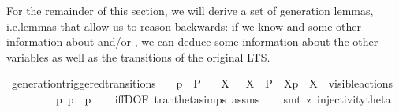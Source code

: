 \begin{isabellebody}
\begin{isamarkuptext}
\end{isamarkuptext}\isamarkuptrue%
%
\isadelimdocument
%
\endisadelimdocument
%
\isatagdocument
%
\isamarkuptrue%
%
\endisatagdocument
{\isafolddocument}%
%
\isadelimdocument
%
\endisadelimdocument
%
\begin{isamarkuptext}%
For the remainder of this section, we will derive a set of generation lemmas, i.e.\@ lemmas that allow us to reason backwards: if we know  and some other information about  and/or \isa{{\isasymalpha}}, we can deduce some information about the other variables as well as the transitions of the original LTS.%
\end{isamarkuptext}\isamarkuptrue%
\isamarkupfalse%
\ generation{\isacharunderscore}{\kern0pt}triggered{\isacharunderscore}{\kern0pt}transitions{\isacharcolon}{\kern0pt}\isanewline
\ \ \ {\isacartoucheopen}{\isasymtheta}{\isacharparenleft}{\kern0pt}p{\isacharparenright}{\kern0pt}\ {\isasymlongmapsto}\isactrlsup {\isasymtheta}{\isasymalpha}\ P{\isacharprime}{\kern0pt}{\isacartoucheclose}\isanewline
\ \ \ {\isacartoucheopen}{\isacharparenleft}{\kern0pt}{\isasymexists}X{\isachardot}{\kern0pt}\ {\isasymalpha}\ {\isacharequal}{\kern0pt}\ {\isasymepsilon}{\isacharbrackleft}{\kern0pt}X{\isacharbrackright}{\kern0pt}\ {\isasymand}\ P{\isacharprime}{\kern0pt}\ {\isacharequal}{\kern0pt}\ {\isasymtheta}{\isacharbrackleft}{\kern0pt}X{\isacharbrackright}{\kern0pt}{\isacharparenleft}{\kern0pt}p{\isacharparenright}{\kern0pt}\ {\isasymand}\ X\ {\isasymsubseteq}\ visible{\isacharunderscore}{\kern0pt}actions{\isacharparenright}{\kern0pt}\ \isanewline
\ \ \ \ {\isasymor}\ {\isacharparenleft}{\kern0pt}{\isasymalpha}\ {\isacharequal}{\kern0pt}\ {\isasymtau}\ {\isasymand}\ {\isacharparenleft}{\kern0pt}{\isasymexists}p{\isacharprime}{\kern0pt}{\isachardot}{\kern0pt}\ p\ {\isasymlongmapsto}{\isasymtau}\ p{\isacharprime}{\kern0pt}{\isacharparenright}{\kern0pt}{\isacharparenright}{\kern0pt}{\isacartoucheclose}\isanewline
%
\isadelimproof
\ \ %
\endisadelimproof
%
\isatagproof
{}\isamarkupfalse%
\ iffD{}{\isacharbrackleft}{\kern0pt}OF\ tran{\isacharunderscore}{\kern0pt}theta{\isachardot}{\kern0pt}simps\ assms{\isacharbrackright}{\kern0pt}\isanewline
\ \ \isamarkupfalse%
\ {\isacharparenleft}{\kern0pt}smt\ {\isacharparenleft}{\kern0pt}z{}{\isacharparenright}{\kern0pt}\ injectivity{\isacharunderscore}{\kern0pt}theta{\isacharparenleft}{\kern0pt}{}{\isacharcomma}{\kern0pt}{}{\isacharparenright}{\kern0pt}{\isacharparenright}{\kern0pt}%

\end{isabellebody}

